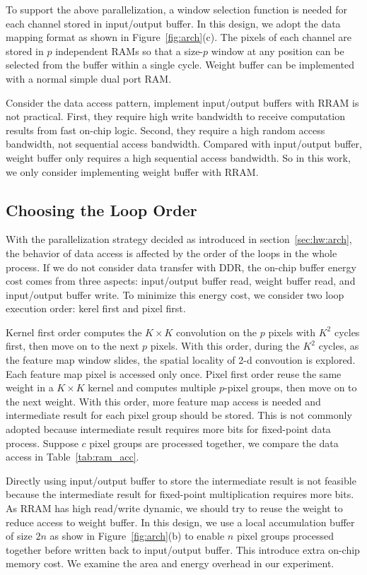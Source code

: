 To support the above parallelization, a window selection function is needed for each channel stored in input/output buffer. In this design, we adopt the data mapping format as shown in Figure~\ref{fig:arch}(c). The pixels of each channel are stored in $p$ independent RAMs so that a size-$p$ window at any position can be selected from the buffer within a single cycle. Weight buffer can be implemented with a normal simple dual port RAM.

Consider the data access pattern, implement input/output buffers with RRAM is not practical. First, they require high write bandwidth to receive computation results from fast on-chip logic. Second, they require a high random access bandwidth, not sequential access bandwidth. Compared with input/output buffer, weight buffer only requires a high sequential access bandwidth. So in this work, we only consider implementing weight buffer with RRAM.


\subsection{Choosing the Loop Order}
With the parallelization strategy decided as introduced in section~\ref{sec:hw:arch}, the behavior of data access is affected by the order of the loops in the whole process. If we do not consider data transfer with DDR, the on-chip buffer energy cost comes from three aspects: input/output buffer read, weight buffer read, and input/output buffer write. To minimize this energy cost, we consider two loop execution order: kerel first and pixel first.

Kernel first order computes the $K\times K$ convolution on the $p$ pixels with $K^2$ cycles first, then move on to the next $p$ pixels. With this order, during the $K^2$ cycles, as the feature map window slides, the spatial locality of 2-d convoution is explored. Each feature map pixel is accessed only once. Pixel first order reuse the same weight in a $K\times K$ kernel and computes multiple $p$-pixel groups, then move on to the next weight. With this order, more feature map access is needed and intermediate result for each pixel group should be stored. This is not commonly adopted because intermediate result requires more bits for fixed-point data process. Suppose $c$ pixel groups are processed together, we compare the data access in Table~\ref{tab:ram_acc}. 



Directly using input/output buffer to store the intermediate result is not feasible because the intermediate result for fixed-point multiplication requires more bits. As RRAM has high read/write dynamic, we should try to reuse the weight to reduce access to weight buffer. In this design, we use a local accumulation buffer of size $2n$ as show in Figure~\ref{fig:arch}(b) to enable $n$ pixel groups processed together before written back to input/output buffer. This introduce extra on-chip memory cost. We examine the area and energy overhead in our experiment.